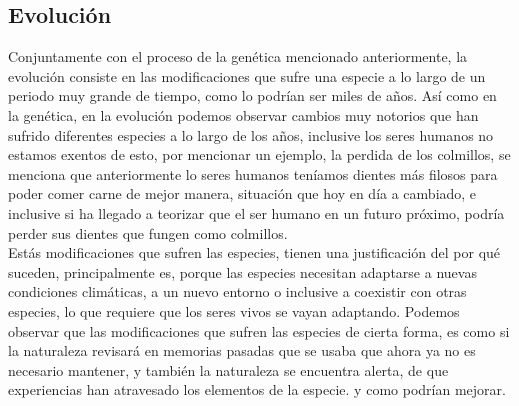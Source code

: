 \subsection{Evolución}
	Conjuntamente con el proceso de la genética mencionado anteriormente, la evolución consiste en las modificaciones que sufre una especie a lo largo de un periodo muy grande de tiempo, como lo podrían ser miles de años. Así como en la genética, en la evolución podemos observar cambios muy notorios que han sufrido diferentes especies a lo largo de los años, inclusive los seres humanos no estamos exentos de esto, por mencionar un ejemplo, la perdida de los colmillos, se menciona que anteriormente lo seres humanos teníamos dientes más filosos para poder comer carne de mejor manera, situación que hoy en día a cambiado, e inclusive si ha llegado a teorizar que el ser humano en un futuro próximo, podría perder sus dientes que fungen como colmillos. \\Estás modificaciones que sufren las especies, tienen una justificación del por qué suceden, principalmente es, porque las especies necesitan adaptarse a nuevas condiciones climáticas, a un nuevo entorno o inclusive a coexistir con otras especies, lo que requiere que los seres vivos se vayan adaptando. Podemos observar que las modificaciones que sufren las especies de cierta forma, es como si la naturaleza revisará en memorias pasadas que se usaba que ahora ya no es necesario mantener, y también la naturaleza se encuentra alerta, de que experiencias han atravesado los elementos de la especie. y como podrían mejorar.